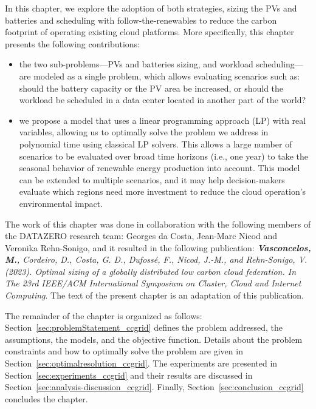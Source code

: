 In this chapter, we explore the adoption of both strategies, sizing the PVs and batteries and scheduling with follow-the-renewables to reduce the carbon footprint of operating existing cloud platforms. More specifically, this chapter presents the following contributions: 

\begin{itemize}
    
    \item the two sub-problems---PVs and batteries sizing, and workload scheduling--- are modeled as a single problem, which allows evaluating scenarios such as: should the battery capacity or the PV area be increased, or should the workload be scheduled in a data center located in another part of the world?
    
    \item we propose a model that uses a linear programming approach (LP) with real variables, allowing us to optimally solve the problem we address in polynomial time using classical LP solvers. This allows a large number of scenarios to be evaluated over broad time horizons (i.e., one year) to take the seasonal behavior of renewable energy production into account. This model can be extended to multiple scenarios, and it may help decision-makers evaluate which regions need more investment to reduce the cloud operation's environmental impact.

\end{itemize}



The work of this chapter was done in collaboration with the following members of the DATAZERO\cite{datazero} research team: Georges da Costa, Jean-Marc Nicod and Veronika Rehn-Sonigo, and it resulted in the following publication:  \textit{\textbf{Vasconcelos, M.}, Cordeiro, D., Costa, G. D., Dufossé, F., Nicod, J.-M., and Rehn-Sonigo, V. (2023). Optimal sizing of a globally distributed low carbon cloud federation. In The 23rd IEEE/ACM International Symposium on Cluster, Cloud and Internet Computing}. The text of the present chapter is an adaptation of this publication.


The remainder of the chapter is organized as follows: Section~\ref{sec:problemStatement_ccgrid} defines the problem addressed, the assumptions, the models, and the objective function. Details about the problem constraints and how to optimally solve the problem are given in Section~\ref{sec:optimalresolution_ccgrid}. The experiments are presented in Section~\ref{sec:experiments_ccgrid} and their results are discussed in Section~\ref{sec:analysis-discussion_ccgrid}. Finally, Section~\ref{sec:conclusion_ccgrid} concludes the chapter. 



